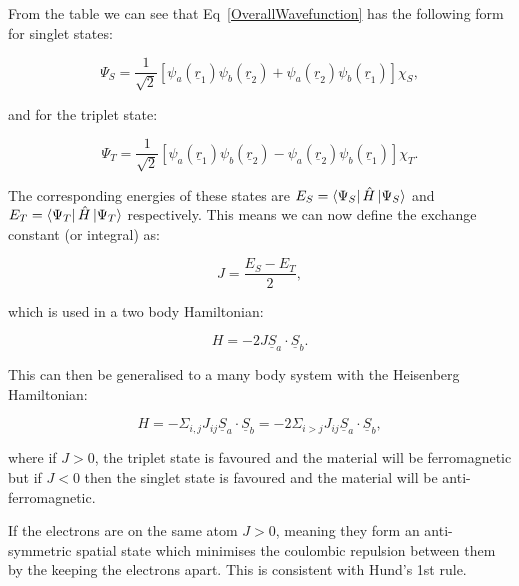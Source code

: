 \noindent From the table we can see that Eq~\ref{OverallWavefunction} has the following form for singlet states:

\begin{equation}
    \Psi_S = \frac{1}{\sqrt{2}} [\psi_a(\underline{r}_1) \psi_b(\underline{r}_2) + \psi_a(\underline{r}_2) \psi_b(\underline{r}_1)] \chi_S,
    \label{SingletStateWavefunction}
\end{equation}

\noindent and for the triplet state:

\begin{equation}
    \Psi_T = \frac{1}{\sqrt{2}} [\psi_a(\underline{r}_1) \psi_b(\underline{r}_2) - \psi_a(\underline{r}_2) \psi_b(\underline{r}_1)] \chi_T.
    \label{TripletStateWavefunction}
\end{equation}

\noindent The corresponding energies of these states are $E_S = \bra{\Psi_S} \Hat{H} \ket{\Psi_S}$ and $E_T = \bra{\Psi_T} \Hat{H} \ket{\Psi_T}$ respectively. This means we can now define the exchange constant (or integral) as:

\begin{equation}
    J = \frac{E_S - E_T}{2},
    \label{ExchangeConstant}
\end{equation}

\noindent which is used in a two body Hamiltonian:

\begin{equation}
    H = -2J\underline{S}_a \cdot \underline{S}_b.
    \label{TwoBodyHamiltonian}
\end{equation}

\noindent This can then be generalised to a many body system with the Heisenberg Hamiltonian:

\begin{equation}
    H = -\Sigma_{i,j} J_{ij} \underline{S}_a \cdot \underline{S}_b = -2 \Sigma_{i>j} J_{ij} \underline{S}_a \cdot \underline{S}_b
    \label{HeisenbergHamiltonian},
\end{equation}

\noindent where if $J>0$, the triplet state is favoured and the material will be ferromagnetic but if $J<0$ then the singlet state is favoured and the material will be anti-ferromagnetic.

\noindent If the electrons are on the same atom $J>0$, meaning they form an anti-symmetric spatial state which minimises the coulombic repulsion between them by the keeping the electrons apart. This is consistent with Hund's 1st rule.

